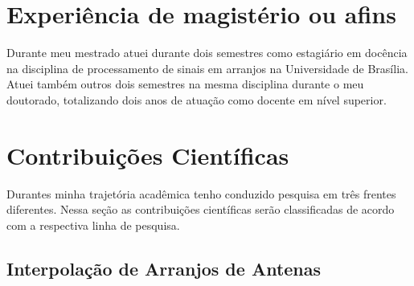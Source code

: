 \documentclass[12pt]{report}
\begin{document}
\section*{Experiência de magistério ou afins}

Durante meu mestrado atuei durante dois semestres como estagiário em docência na disciplina de processamento de sinais em arranjos na Universidade de Brasília. Atuei também outros dois semestres na mesma disciplina durante o meu doutorado, totalizando dois anos de atuação como docente em nível superior.

\section*{Contribuições Científicas}

Durantes minha trajetória acadêmica tenho conduzido pesquisa em três frentes diferentes. Nessa seção as contribuições científicas serão classificadas de acordo com a respectiva linha de pesquisa.

\subsection*{Interpolação de Arranjos de Antenas}
\end{document}
